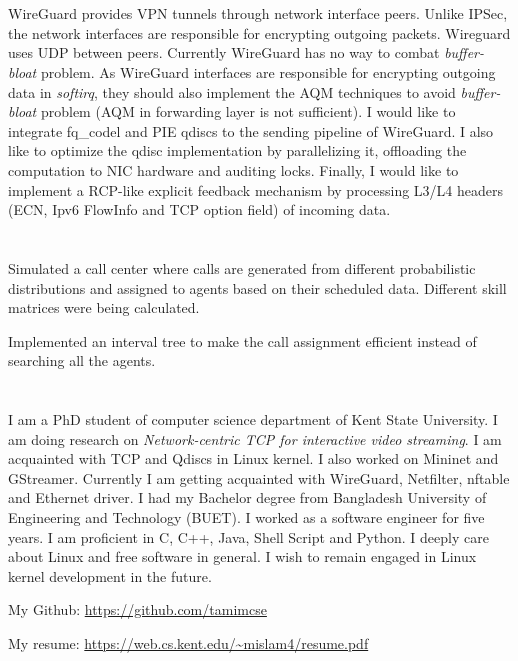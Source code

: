 \documentclass{res}
\begin{document}
\thispagestyle{empty} %


\begin{resume}

\section{} 
WireGuard provides VPN tunnels through network interface peers. Unlike IPSec, the network interfaces are responsible for encrypting outgoing packets. Wireguard uses UDP between peers. Currently WireGuard has no way to combat \textit{buffer-bloat} problem. As WireGuard interfaces are responsible for encrypting outgoing data in \textit{softirq}, they should also implement the AQM techniques to avoid \textit{buffer-bloat} problem (AQM in forwarding layer is not sufficient). I would like to integrate fq\_codel and PIE qdiscs to the sending pipeline of WireGuard. I also like to optimize the qdisc implementation by parallelizing it, offloading the computation to NIC hardware and auditing locks. Finally, I would like to implement a RCP-like explicit feedback mechanism by processing L3/L4 headers (ECN, Ipv6 FlowInfo and TCP option field) of incoming data. 

\section{} 


\section{} 

Simulated a call center where calls are generated from different probabilistic distributions and assigned to agents based on their scheduled data. Different skill matrices were being calculated.

Implemented an interval tree to make the call assignment efficient instead of searching all the agents.


\section{} 
I am a PhD student of computer science department of Kent State University. I am doing research on \textit{Network-centric TCP for interactive video streaming}. I am acquainted with TCP and Qdiscs in Linux kernel. I also worked on Mininet and GStreamer. Currently I am getting acquainted with WireGuard, Netfilter, nftable and Ethernet driver.  I had my Bachelor degree from Bangladesh University of Engineering and Technology (BUET). I worked as a software engineer for five years. I am proficient in C, C++, Java, Shell Script and Python. I deeply care about Linux and free software in general. I wish to remain engaged in Linux kernel development in the future.


My Github: \url{https://github.com/tamimcse}

My resume: \url{https://web.cs.kent.edu/~mislam4/resume.pdf}

 
 
\end{resume} 
\end{document}
